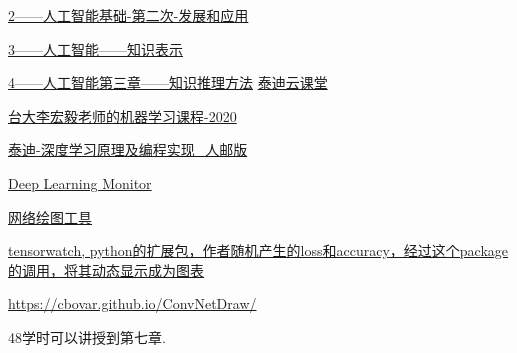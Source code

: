 \begin{pre}
\href{https://ke.qq.com/webcourse/index.html?cid=1086628&term_id=101182654&lite=1&from=800021724#taid=8423279&vid=5285890799803709554}{2——人工智能基础-第二次-发展和应用}

\href{https://github.com/zggl/AITeachingPlanDraft2020/blob/master/3-\%E4\%BA\%BA\%E5\%B7\%A5\%E6\%99\%BA\%E8\%83\%BD\%E7\%AC\%AC\%E4\%BA\%8C\%E7\%AB\%A0\%E7\%AC\%AC\%E4\%B8\%80\%E6\%AC\%A1\%E5\%B9\%BB\%E7\%81\%AF\%20\%E4\%BA\%BA\%E5\%B7\%A5\%E6\%99\%BA\%E8\%83\%BD\%E7\%9A\%84\%E7\%9F\%A5\%E8\%AF\%86\%E8\%A1\%A8\%E7\%A4\%BA.pdf}{3——人工智能——知识表示}

\href{https://github.com/zggl/AITeachingPlanDraft2020/blob/master/4-\%E4\%BA\%BA\%E5\%B7\%A5\%E6\%99\%BA\%E8\%83\%BD\%E7\%AC\%AC\%E4\%B8\%89\%E7\%AB\%A0\%E7\%AC\%AC\%E4\%B8\%80\%E6\%AC\%A1\%20\%E4\%BA\%BA\%E5\%B7\%A5\%E6\%99\%BA\%E8\%83\%BD\%E7\%9A\%84\%E7\%9F\%A5\%E8\%AF\%86\%E6\%8E\%A8\%E7\%90\%86\%E6\%96\%B9\%E6\%B3\%95.pdf}{4——人工智能第三章——知识推理方法}
\href{https://edu.tipdm.org/notification?id=32302}{泰迪云课堂}

\href{http://speech.ee.ntu.edu.tw/~tlkagk/courses_ML20.html}{台大李宏毅老师的机器学习课程-2020}

\href{https://edu.tipdm.org/classroom/122/courses}{泰迪-深度学习原理及编程实现\_人邮版}

\href{https://deeplearn.org/}{Deep Learning Monitor}

\href{http://alexlenail.me/NN-SVG/}{网络绘图工具} 

\href{}{tensorwatch, python的扩展包，作者随机产生的loss和accuracy，经过这个package的调用，将其动态显示成为图表}

\href{ConvNetDraw（卷积神经网络）,配置命令的CNN神经网络画图工具，开发者是香港的一位程序员。}{https://cbovar.github.io/ConvNetDraw/}

48学时可以讲授到第七章.

\end{pre} 